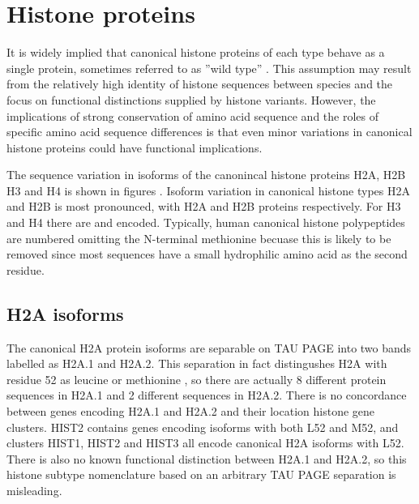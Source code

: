 \section{Histone proteins}

	It is widely implied that canonical histone proteins of each type behave as a single protein, 
	sometimes referred to as ''wild type'' . 
	This assumption may result from the relatively high identity of histone sequences between species 
	and the focus on functional distinctions supplied by histone variants. 
	However, the implications of strong conservation of amino acid sequence 
	and the roles of specific amino acid sequence differences  
	is that even minor variations in canonical histone proteins could have functional implications.
	
	The sequence variation in isoforms of the canonincal histone proteins H2A, H2B H3 and H4 
	is shown in figures .
	Isoform variation in canonical histone types H2A and H2B is most pronounced, 
	with \HTwoAUniqueProteins{} H2A and \HTwoBUniqueProteins{} H2B proteins respectively. 
	For H3 and H4 there are \HThreeUniqueProteins{} and \HFourUniqueProteins{} encoded. 
	Typically, human canonical histone polypeptides are numbered omitting the N-terminal methionine 
	becuase this is likely to be removed since most sequences have a small hydrophilic amino acid as the second residue.

  \subsection{H2A isoforms}
	
	The canonical H2A protein isoforms are separable on TAU PAGE into two bands labelled as H2A.1 and H2A.2. 
	This separation in fact distingushes H2A with residue 52 as leucine or methionine , 
	so there are actually 8 different protein sequences in H2A.1 and 2 different sequences in H2A.2. 
	There is no concordance between genes encoding H2A.1 and H2A.2 and their location histone gene clusters. 
	HIST2 contains genes encoding isoforms with both L52 and M52, 
	and clusters HIST1, HIST2 and HIST3 all encode canonical H2A isoforms with L52. 
	There is also no known functional distinction between H2A.1 and H2A.2, 
	so this histone subtype nomenclature based on an arbitrary TAU PAGE separation is misleading.

